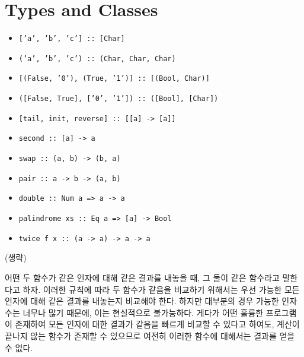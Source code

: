 \chapter{\Large{Types and Classes}}


\begin{itemize}
\item \texttt{['a', 'b', 'c'] :: [Char]}
\item \texttt{('a', 'b', 'c') :: (Char, Char, Char)}
\item \texttt{[(False, '0'), (True, '1')] :: [(Bool, Char)]}
\item \texttt{([False, True], ['0', '1']) :: ([Bool], [Char])}
\item \texttt{[tail, init, reverse] :: [[a] -> [a]]}
\end{itemize}


\begin{itemize}
\item \texttt{second :: [a] -> a}
\item \texttt{swap :: (a, b) -> (b, a)}
\item \texttt{pair :: a -> b -> (a, b)}
\item \texttt{double :: Num a => a -> a}
\item \texttt{palindrome xs :: Eq a => [a] -> Bool}
\item \texttt{twice f x :: (a -> a) -> a -> a}
\end{itemize}


(생략)


어떤 두 함수가 같은 인자에 대해 같은 결과를 내놓을 때, 그 둘이 같은 함수라고
말한다고 하자. 이러한 규칙에 따라 두 함수가 같음을 비교하기 위해서는 우선
가능한 모든 인자에 대해 같은 결과를 내놓는지 비교해야 한다. 하지만 대부분의
경우 가능한 인자수는 너무나 많기 때문에, 이는 현실적으로 불가능하다. 게다가 어떤
훌륭한 프로그램이 존재하여 모든 인자에 대한 결과가
같음을 빠르게 비교할 수 있다고 하여도, 계산이 끝나지 않는 함수가 존재할 수
있으므로 여전히 이러한 함수에 대해서는 결과를 얻을 수 없다.



